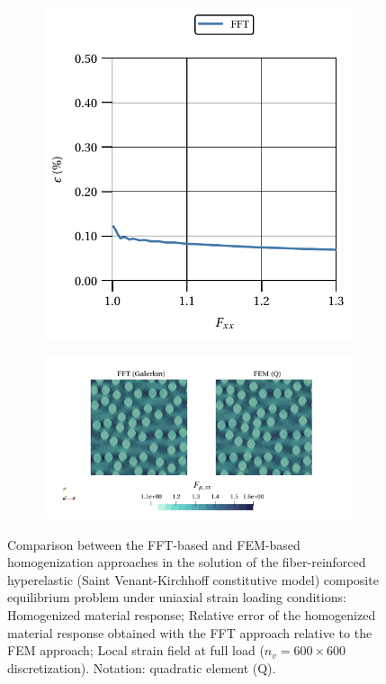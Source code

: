 \begin{figure}[hbt]
\begin{subfigure}[b]{0.49\textwidth}
    \includegraphics[width=\textwidth]{figures/svk_2D_normal_material_response_error}
    \caption{}
    \label{subfig:svk_2D_normal_material_response_error}
  \end{subfigure}
  \begin{subfigure}[b]{\textwidth}
    \centering
    \includegraphics[width=\textwidth]{figures/svk_mat_res_2D_normal_strain_11}
    \caption{}
    \label{subfig:svk_mat_res_2D_normal_strain_11}
  \end{subfigure}
  \caption{Comparison between the FFT-based and FEM-based homogenization approaches in the solution of the fiber-reinforced hyperelastic (Saint Venant-Kirchhoff constitutive model) composite equilibrium problem under uniaxial strain loading conditions:  Homogenized material response;  Relative error of the homogenized material response obtained with the FFT approach relative to the FEM approach;  Local strain field at full load (\(n_v = 600 \times 600\) discretization). Notation: quadratic element (Q).}
\label{fig:svk_mat_res_2D_normal}
\end{figure}


